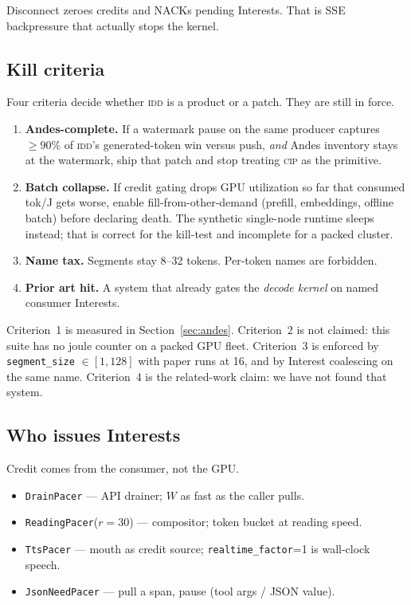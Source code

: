 \documentclass{article}
\theoremstyle{definition}
\newcommand{\cip}{\textsc{cip}}
\newcommand{\idd}{\textsc{idd}}
\begin{document}
Disconnect zeroes credits and NACKs pending Interests.
That is SSE backpressure that actually stops the kernel.

\subsection{Kill criteria}
\label{sec:kills}

Four criteria decide whether \idd{} is a product or a patch.
They are still in force.

\begin{enumerate}[leftmargin=1.6em,itemsep=2pt]
\item \textbf{Andes-complete.} If a watermark pause on the same producer captures $\ge 90\%$ of \idd{}'s generated-token win versus push, \emph{and} Andes inventory stays at the watermark, ship that patch and stop treating \cip{} as the primitive.
\item \textbf{Batch collapse.} If credit gating drops GPU utilization so far that consumed tok/J gets worse, enable fill-from-other-demand (prefill, embeddings, offline batch) before declaring death.
  The synthetic single-node runtime sleeps instead; that is correct for the kill-test and incomplete for a packed cluster.
\item \textbf{Name tax.} Segments stay 8--32 tokens. Per-token names are forbidden.
\item \textbf{Prior art hit.} A system that already gates the \emph{decode kernel} on named consumer Interests.
\end{enumerate}

Criterion~1 is measured in Section~\ref{sec:andes}.
Criterion~2 is not claimed: this suite has no joule counter on a packed GPU fleet.
Criterion~3 is enforced by \texttt{segment\_size} $\in [1,128]$ with paper runs at 16, and by Interest coalescing on the same name.
Criterion~4 is the related-work claim: we have not found that system.

\subsection{Who issues Interests}

Credit comes from the consumer, not the GPU.

\begin{itemize}[leftmargin=1.4em,itemsep=1pt]
\item \texttt{DrainPacer} --- API drainer; $W$ as fast as the caller pulls.
\item \texttt{ReadingPacer}($r{=}30$) --- compositor; token bucket at reading speed.
\item \texttt{TtsPacer} --- mouth as credit source; \texttt{realtime\_factor}{=}1 is wall-clock speech.
\item \texttt{JsonNeedPacer} --- pull a span, pause (tool args / JSON value).
\end{itemize}
\end{document}
